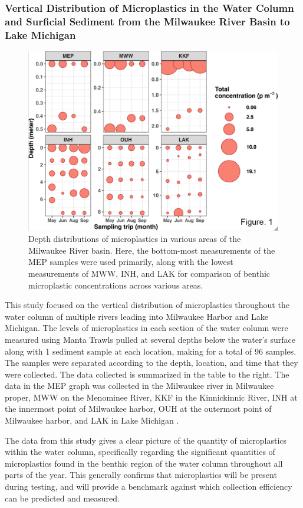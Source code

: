 \documentclass[fleqn,10pt]{SelfArx} %
\begin{document}
	\subsubsection*{Vertical Distribution of Microplastics in the Water Column and Surficial Sediment from the Milwaukee River Basin to Lake Michigan}
	\begin{figure}[h]
		\centering
		\includegraphics[width=0.8\linewidth]{Figures/DepthDistribution.png}
		\caption[Vertical MP Distribution]{Depth distributions of microplastics in various areas of the Milwaukee River basin. Here, the bottom-most measurements of the MEP samples were used primarily, along with the lowest measurements of MWW, INH, and LAK for comparison of \gls{benthic} microplastic concentrations across various areas.}
		\label{fig:VerticalDepthDist}
	\end{figure}
	This study focused on the vertical distribution of microplastics throughout the water column of multiple rivers leading into Milwaukee Harbor and Lake Michigan. The levels of microplastics in each section of the water column were measured using Manta Trawls pulled at several depths below the water’s surface along with 1 sediment sample at each location, making for a total of 96 samples. The samples were separated according to the depth, location, and time that they were collected. The data collected is summarized in the table to the right. The data in the MEP graph was collected in the Milwaukee river in Milwaukee proper, MWW on the Menominee River, KKF in the Kinnickinnic River, INH at the innermost point of Milwaukee harbor, OUH at the outermost point of Milwaukee harbor, and LAK in Lake Michigan \cite{LenakerEtAlvertdist}.
	
	The data from this study gives a clear picture of the quantity of microplastics within the water column, specifically regarding the significant quantities of microplastics found in the \gls{benthic} region of the water column throughout all parts of the year. This generally confirms that microplastics will be present during testing, and will provide a benchmark against which collection efficiency can be predicted and measured.
	
\end{document}
